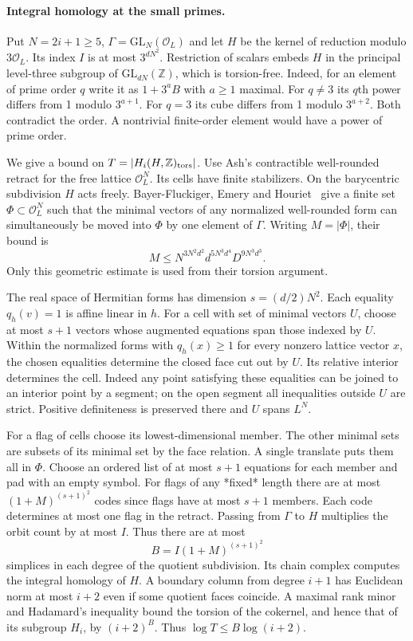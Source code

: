 \paragraph{Integral homology at the small primes.}

Put $N=2i+1\ge5$, $\Gamma=\mathrm{GL}_N(\mathcal O_L)$ and let $H$ be the kernel of reduction modulo $3\mathcal O_L$. Its index $I$ is at most $3^{dN^2}$. Restriction of scalars embeds $H$ in the principal level-three subgroup of $\mathrm{GL}_{dN}(\mathbb Z)$, which is torsion-free. Indeed, for an element of prime order $q$ write it as $1+3^aB$ with $a\ge1$ maximal. For $q\ne3$ its $q$th power differs from 1 modulo $3^{a+1}$. For $q=3$ its cube differs from 1 modulo $3^{a+2}$. Both contradict the order. A nontrivial finite-order element would have a power of prime order.

We give a bound on $T=|H_i(H,\mathbb Z)_{\rm tors}|$. Use Ash's contractible well-rounded retract for the free lattice $\mathcal O_L^N$. Its cells have finite stabilizers. On the barycentric subdivision $H$ acts freely. Bayer-Fluckiger, Emery and Houriet~\cite[\S2.3, Cor.~5.2]{badCells} give a finite set $\Phi\subset\mathcal O_L^N$ such that the minimal vectors of any normalized well-rounded form can simultaneously be moved into $\Phi$ by one element of $\Gamma$. Writing $M=|\Phi|$, their bound is
\[ M\le N^{3N^2d^2}d^{5N^3d^4}D^{9N^3d^3}. \]
Only this geometric estimate is used from their torsion argument.

The real space of Hermitian forms has dimension $s=(d/2)N^2$. Each equality $q_h(v)=1$ is affine linear in $h$. For a cell with set of minimal vectors $U$, choose at most $s+1$ vectors whose augmented equations span those indexed by $U$. Within the normalized forms with $q_h(x)\ge1$ for every nonzero lattice vector $x$, the chosen equalities determine the closed face cut out by $U$. Its relative interior determines the cell. Indeed any point satisfying these equalities can be joined to an interior point by a segment; on the open segment all inequalities outside $U$ are strict. Positive definiteness is preserved there and $U$ spans $L^N$.

For a flag of cells choose its lowest-dimensional member. The other minimal sets are subsets of its minimal set by the face relation. A single translate puts them all in $\Phi$. Choose an ordered list of at most $s+1$ equations for each member and pad with an empty symbol. For flags of any *fixed* length there are at most $(1+M)^{(s+1)^2}$ codes since flags have at most $s+1$ members. Each code determines at most one flag in the retract. Passing from $\Gamma$ to $H$ multiplies the orbit count by at most $I$. Thus there are at most
\[B=I(1+M)^{(s+1)^2}\]
simplices in each degree of the quotient subdivision. Its chain complex computes the integral homology of $H$. A boundary column from degree $i+1$ has Euclidean norm at most $i+2$ even if some quotient faces coincide. A maximal rank minor and Hadamard's inequality bound the torsion of the cokernel, and hence that of its subgroup $H_i$, by $(i+2)^B$. Thus $\log T\le B\log(i+2)$.

